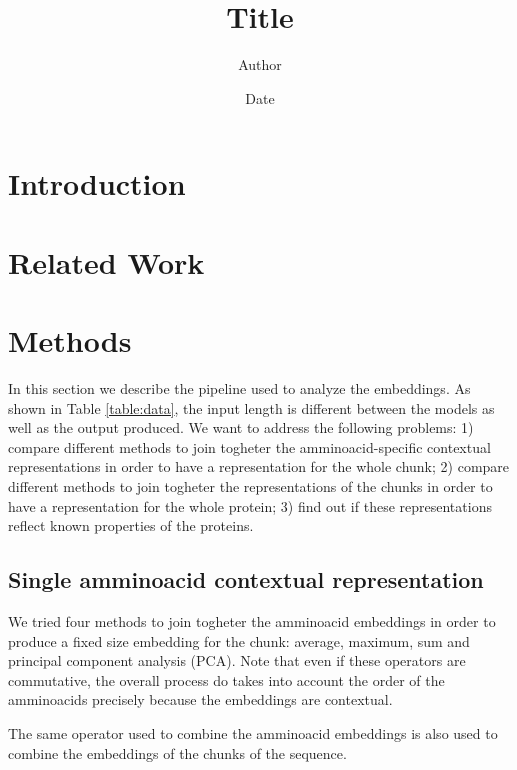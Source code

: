 \documentclass[12pt, letterpaper, twocolumn]{article}
\title{Title}
\author{Author}
\date{Date}
\begin{document}
\maketitle

\section{Introduction}

\section{Related Work}

\section{Methods}

In this section we describe the pipeline used to analyze the embeddings. As shown in Table \ref{table:data}, the input length is different between the models as well as the output produced. We want to address the following problems: 1) compare different methods to join togheter the amminoacid-specific contextual representations in order to have a representation for the whole chunk; 2) compare different methods to join togheter the representations of the chunks in order to have a representation for the whole protein; 3) find out if these representations reflect known properties of the proteins.

\subsection{Single amminoacid contextual representation}
We tried four methods to join togheter the amminoacid embeddings in order to produce a fixed size embedding for the chunk: average, maximum, sum and principal component analysis (PCA). Note that even if these operators are commutative, the overall process do takes into account the order of the amminoacids precisely because the embeddings are contextual.

The same operator used to combine the amminoacid embeddings is also used to combine the embeddings of the chunks of the sequence.
\end{document}
